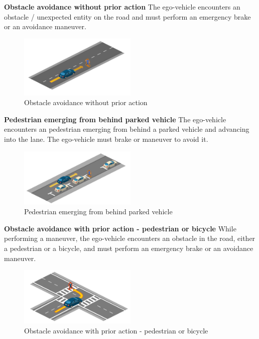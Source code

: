\documentclass{article}
\begin{document}
\textbf{Obstacle avoidance without prior action} 
The ego-vehicle encounters an obstacle / unexpected entity on the road and must perform an emergency brake or an avoidance maneuver.
\begin{figure}[h]
    \centering
    \includegraphics[width=0.5\textwidth]{img/TR03.png}
    \caption{Obstacle avoidance without prior action} \label{Scenario_obsAvoidanceWithout}
\end{figure}

\textbf{Pedestrian emerging from behind parked vehicle} 
The ego-vehicle encounters an pedestrian emerging from behind a parked vehicle and advancing into the lane. The ego-vehicle must brake or maneuver to avoid it.
\begin{figure}[h]
    \centering
    \includegraphics[width=0.5\textwidth]{img/TR17.png}
    \caption{Pedestrian emerging from behind parked vehicle} \label{Scenario_pedestrianEmerging}
\end{figure}

\textbf{Obstacle avoidance with prior action - pedestrian or bicycle} 
While performing a maneuver, the ego-vehicle encounters an obstacle in the road, either a pedestrian or a bicycle, and must perform an emergency brake 
or an avoidance maneuver.
\begin{figure}[h]
    \centering
    \includegraphics[width=0.5\textwidth]{img/TR04.png}
    \caption{Obstacle avoidance with prior action - pedestrian or bicycle} \label{Scenario_obsAvoidanceWithPedBic}
\end{figure}
\end{document}
